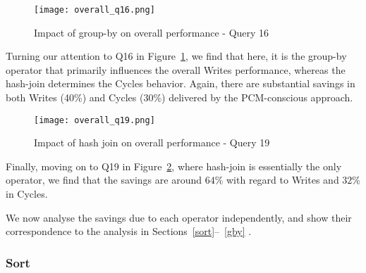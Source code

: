 \begin{figure}[htbp]
	\centering
	\texttt{[image: overall\_q16.png]}
	\caption{Impact of group-by on overall performance - Query 16}
	\label{fig:overall_results_q16}
\end{figure}
Turning our attention to Q16 in Figure~\ref{fig:overall_results_q16},
we find that here, it is the group-by operator that primarily influences
the overall Writes performance, whereas the hash-join determines the
Cycles behavior. Again, there are substantial savings in both Writes
(40\%) and  Cycles (30\%) delivered by the PCM-conscious approach.

\begin{figure}[htbp]
	\centering
 	\texttt{[image: overall\_q19.png]}
	\caption{Impact of hash join on overall performance - Query 19}
	\label{fig:overall_results_q19}
\end{figure}



\begin{comment}
In case of Q13, the running time and writes for the sort operator formed
the bulk of the writes and time taken for the entire query. The group-by
operator comparatively incurred negligible writes and running time. Writes
savings of 53\% and running time savings of 20\% were observed for the
execution of Q13 (shown in sub-figures (a) and (b) resp.) as compared
to native; fuelled mainly by the sort operator.
\end{comment}



\begin{comment}
In case of Q16, both the group-by and hash join operators incurred
significant writes and time. We observed savings of $40\%$ in writes
besides $30\%$ savings in running time as compared to  native algorithms.
\end{comment}

Finally, moving on to Q19 in Figure~\ref{fig:overall_results_q19},
where hash-join is essentially the only operator, we find that the
savings are around $64\%$ with regard to Writes and $32\%$ in Cycles.

We now analyse the savings due to each operator independently, and
show their correspondence to the analysis in Sections~\ref{sort}--~\ref{gby} . 
 
\subsubsection{Sort}

